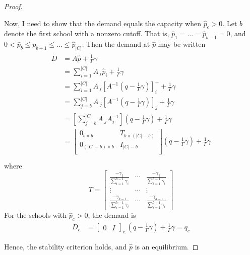 \documentclass[12pt]{article}
\numberwithin{equation}{subsection}
\theoremstyle{definition}
\begin{document}
\begin{proof}
\begin{enumerate}
Now, I need to show that the demand equals the capacity when $\hat p_c > 0$. Let $b$ denote the first school with a nonzero cutoff. That is, $\hat p_1 = \dots = \hat p_{b-1} = 0$, and $0 < \hat p_b \leq p_{b+1} \leq \dots \leq \hat p_{|C|}$. Then the demand at $\hat p$ may be written
\begin{gather}\begin{aligned} \label{demandatphat}
D &= A \hat p + \frac{1}{\Gamma}\gamma \\
&= \sum_{i=1}^{|C|} A_{.i} \hat p_i + \frac{1}{\Gamma}\gamma  \\
&= \sum_{i=1}^{|C|} A_{.i} \left[A^{-1} \left(q - \frac{1}{\Gamma}\gamma\right) \right]_i^+ + \frac{1}{\Gamma}\gamma  \\
&= \sum_{j=b}^{|C|} A_{.j} \left[A^{-1} \left(q - \frac{1}{\Gamma}\gamma\right) \right]_j + \frac{1}{\Gamma}\gamma  \\
&= \left[\sum_{j=b}^{|C|} A_{.j} A_{j.}^{-1} \right] \left(q - \frac{1}{\Gamma}\gamma\right) + \frac{1}{\Gamma}\gamma  \\
&= \begin{bmatrix}
0_{b \times b} & T_{b \times (|C| - b)} \\
0_{(|C| - b) \times b} & I_{|C| - b} \\
\end{bmatrix} \left(q - \frac{1}{\Gamma}\gamma\right) + \frac{1}{\Gamma}\gamma  \\
\end{aligned}\end{gather}
where
\begin{equation} \label{Tdef}
T = \begin{bmatrix}
\frac{-\gamma_1}{\sum_{i=1}^{b-1} \gamma_i} & \cdots & \frac{-\gamma_1}{\sum_{i=1}^{b-1} \gamma_i} \\
\vdots & \cdots & \vdots \\
\frac{-\gamma_{b-1}}{\sum_{i=1}^{b-1} \gamma_i} & \cdots & \frac{-\gamma_{b-1}}{\sum_{i=1}^{b-1} \gamma_i}
\end{bmatrix}\end{equation}
For the schools with $\hat p_c > 0$, the demand is
\begin{align} \label{demand-pc-gt-zero}
D_c &=
\begin{bmatrix}
0& I
\end{bmatrix}_{c.} \left(q - \frac{1}{\Gamma}\gamma\right) + \frac{1}{\Gamma}\gamma
= q_c
\end{align}
\end{enumerate}
Hence, the stability criterion holds, and $\hat p$ is an equilibrium.
\end{proof}
\end{document}
